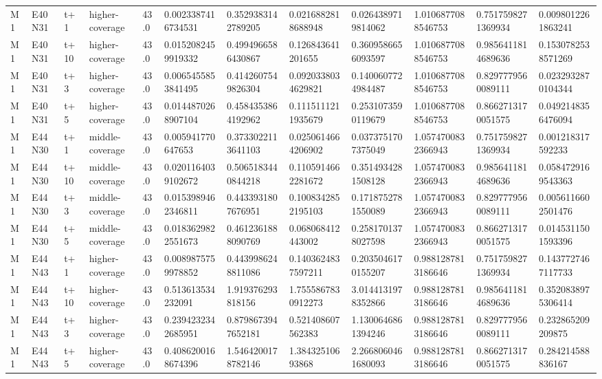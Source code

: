 \begin{landscape}
\begin{longtable}{llllllllllll}
M1 & E40N31 & t+1 & higher-coverage & 43.0 & 0.0023387416734531 & 0.3529383142789205 & 0.0216882818688948 & 0.0264389719814062 & 1.0106877088546753 & 0.7517598271369934 & 0.0098012261863241 \\
M1 & E40N31 & t+10 & higher-coverage & 43.0 & 0.0152082459919332 & 0.4994966586430867 & 0.126843641201655 & 0.3609586656093597 & 1.0106877088546753 & 0.9856411814689636 & 0.1530782538571269 \\
M1 & E40N31 & t+3 & higher-coverage & 43.0 & 0.0065455853841495 & 0.4142607549826304 & 0.0920338034629821 & 0.1400607724984487 & 1.0106877088546753 & 0.8297779560089111 & 0.0232932870104344 \\
M1 & E40N31 & t+5 & higher-coverage & 43.0 & 0.0144870268907104 & 0.4584353864192962 & 0.1115111211935679 & 0.2531073590119679 & 1.0106877088546753 & 0.8662713170051575 & 0.0492148356476094 \\
M1 & E44N30 & t+1 & middle-coverage & 43.0 & 0.005941770647653 & 0.3733022113641103 & 0.0250614664206902 & 0.0373751707375049 & 1.0574700832366943 & 0.7517598271369934 & 0.001218317592233 \\
M1 & E44N30 & t+10 & middle-coverage & 43.0 & 0.0201164039102672 & 0.5065183440844218 & 0.1105914662281672 & 0.3514934281508128 & 1.0574700832366943 & 0.9856411814689636 & 0.0584729169543363 \\
M1 & E44N30 & t+3 & middle-coverage & 43.0 & 0.0153989462346811 & 0.4433931807676951 & 0.1008342852195103 & 0.1718752781550089 & 1.0574700832366943 & 0.8297779560089111 & 0.0056116602501476 \\
M1 & E44N30 & t+5 & middle-coverage & 43.0 & 0.0183629822551673 & 0.4612361888090769 & 0.068068412443002 & 0.2581701378027598 & 1.0574700832366943 & 0.8662713170051575 & 0.0145311501593396 \\
M1 & E44N43 & t+1 & higher-coverage & 43.0 & 0.0089875759978852 & 0.4439986248811086 & 0.1403624837597211 & 0.2035046170155207 & 0.9881287813186646 & 0.7517598271369934 & 0.1437727467117733 \\
M1 & E44N43 & t+10 & higher-coverage & 43.0 & 0.513613534232091 & 1.919376293818156 & 1.7555867830912273 & 3.0144131978352866 & 0.9881287813186646 & 0.9856411814689636 & 0.3520838975306414 \\
M1 & E44N43 & t+3 & higher-coverage & 43.0 & 0.2394232342685951 & 0.8798673947652181 & 0.521408607562383 & 1.1300646861394246 & 0.9881287813186646 & 0.8297779560089111 & 0.232865209209875 \\
M1 & E44N43 & t+5 & higher-coverage & 43.0 & 0.4086200168674396 & 1.5464200178782146 & 1.38432510693868 & 2.2668060461680093 & 0.9881287813186646 & 0.8662713170051575 & 0.284214588836167 \\

\end{longtable}
\end{landscape}
